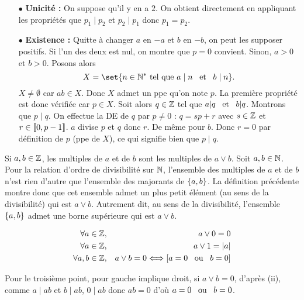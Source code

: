 \documentclass{magnolia}
\begin{document}
\begin{preuve}
\begin{itemize}
\item[$\bullet$] \textbf{Unicité :} On suppose qu'il y en a $2$. On obtient directement en appliquant les propriétés que $p_1\mid p_2$ et $p_2\mid p_1$ donc $p_1=p_2$.
\item[$\bullet$] \textbf{Existence :} Quitte à changer $a$ en $-a$ et $b$ en $-b$, on peut les supposer positifs. Si l'un des deux est nul, on montre que $p=0$ convient. Sinon, $a>0$ et $b>0$. Posons alors $$X=\set{n\in \Ns \text{ tel que } a\mid n \et b\mid n}.$$
$X\neq \emptyset$ car $ab\in X$. Donc $X$ admet un ppe qu'on note $p$. La première propriété est donc vérifiée car $p\in X$. Soit alors $q\in \mathbb{Z}$ tel que $a|q \quad\!\text{et}\quad\! b|q$. Montrons que $p\mid q$. On effectue la DE de $q$ par $p\neq 0$ : $q=sp+r$ avec $s\in \mathbb{Z}$ et $r\in \left\llbracket 0,p-1\right\rrbracket$. $a$ divise $p$ et $q$ donc $r$. De même pour $b$. Donc $r=0$ par définition de $p$ (ppe de $X$), ce qui signifie bien que $p\mid q$.
\end{itemize}

\end{preuve}

\begin{remarques}
  \remarque Si $a,b\in\mathbb{Z}$, les multiples de $a$ et de $b$ sont les multiples
    de $a\vee b$.
  \remarque Soit $a,b\in\mathbb{N}$. Pour la relation d'ordre de divisibilité sur $\mathbb{N}$, l'ensemble
    des multiples de $a$ et de $b$ n'est rien d'autre que
    l'ensemble des majorants de $\left\{a,b\right\}$. La définition précédente montre donc que
    cet ensemble admet un plus petit élément (au sens de la divisibilité) qui est
    $a\vee b$. Autrement dit, au sens de la divisibilité, l'ensemble $\left\{a,b\right\}$ admet
    une borne supérieure qui est $a\vee b$.
  \end{remarques}


\begin{proposition}
\begin{eqnarray*}
\forall a\in\mathbb{Z}, & & a\vee 0=0\\
\forall a\in\mathbb{Z}, & & a\vee 1=\left|a\right|\\
\forall a,b\in\mathbb{Z}, & & a\vee b=0 \Longleftrightarrow \left[a=0 \quad\!\text{ou}\quad\! b=0\right]
\end{eqnarray*}
\end{proposition}

\begin{preuve}
Pour le troisième point, pour gauche implique droit, si $a\vee b=0$, d'après (ii), comme $a\mid ab$ et $b\mid ab$, $0\mid ab$ donc $ab=0$ d'où $a=0 \quad\!\text{ou}\quad\! b=0$.
\end{preuve}
\end{document}
